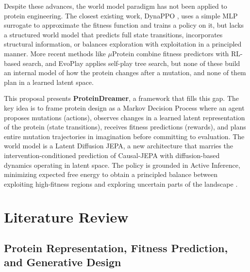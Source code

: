 \documentclass[12pt, a4paper]{article}
\begin{document}
Despite these advances, the world model paradigm has not been applied to protein engineering. The closest existing work, DynaPPO \citep{angermueller2020dynappo}, uses a simple MLP surrogate to approximate the fitness function and trains a policy on it, but lacks a structured world model that predicts full state transitions, incorporates structural information, or balances exploration with exploitation in a principled manner. More recent methods like $\mu$Protein \citep{sun2025muprotein} combine fitness predictors with RL-based search, and EvoPlay \citep{wang2023evoplay} applies self-play tree search, but none of these build an internal model of how the protein changes after a mutation, and none of them plan in a learned latent space.

This proposal presents \textbf{ProteinDreamer}, a framework that fills this gap. The key idea is to frame protein design as a Markov Decision Process where an agent proposes mutations (actions), observes changes in a learned latent representation of the protein (state transitions), receives fitness predictions (rewards), and plans entire mutation trajectories in imagination before committing to evaluation. The world model is a Latent Diffusion JEPA, a new architecture that marries the intervention-conditioned prediction of Causal-JEPA with diffusion-based dynamics operating in latent space. The policy is grounded in Active Inference, minimizing expected free energy to obtain a principled balance between exploiting high-fitness regions and exploring uncertain parts of the landscape \citep{parr2022active, tschantz2020rl_active_inference}.

\section{Literature Review}
\label{sec:literature}

\subsection{Protein Representation, Fitness Prediction, and Generative Design}
\end{document}
